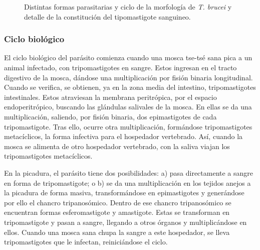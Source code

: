 \begin{figure}[H]
	\caption[Morfología de \textit{T. brucei}]{Distintas formas parasitarias y ciclo de la morfología de \textit{T. brucei} y detalle de la constitución del tipomastigote sanguineo.\label{fig:PARASIT:TBruceiMorf}}
\end{figure}
\subsubsection{Ciclo biológico}
El ciclo biológico del parásito comienza cuando una mosca tse-tsé sana pica a un animal infectado, con tripomastigotes en sangre. Estos ingresan en el  tracto digestivo de la mosca, dándose una multiplicación por fisión binaria longitudinal. Cuando se verifica, se obtienen, ya en la zona media del intestino, tripomastigotes intestinales. Estos atraviesan la membrana peritrópica, por el espacio endoperitrópico, buscando las glándulas salivales de la mosca. En ellas se da una multiplicación, saliendo, por fisión binaria, dos epimastigotes de cada tripomastigote. Tras ello, ocurre otra multiplicación, formándose tripomastigotes metacíclicos, la forma infectiva para el hospedador vertebrado. Así, cuando la mosca se alimenta de otro hospedador vertebrado, con la saliva viajan los tripomastigotes metacíclicos.

En la picadura, el parásito tiene dos posibilidades: a) pasa directamente a sangre en forma de tripomastigote; o b) se da una multiplicación en los tejidos anejos a la picadura de forma masiva, transformándose en epimastigotes y generándose por ello el chancro tripanosómico. Dentro de ese chancro tripanosómico se encuentran formas esferomastigote y amastigote. Estas se transforman en tripomastigote y pasan a sangre, llegando a otros órganos y multiplicándose en ellos. Cuando una mosca sana chupa la sangre a este hospedador, se lleva tripomastigotes que le infectan, reiniciándose el ciclo.

